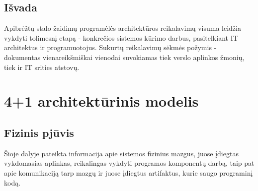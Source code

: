 \documentclass{VUMIFPSkursinis}
\begin{document}
\subsection{Išvada}
Apibrėžtų stalo žaidimų programėlės architektūros reikalavimų visuma leidžia vykdyti tolimesnį etapą - konkrečios sistemos kūrimo darbus, pasitelkiant IT architektus ir programuotojus. Sukurtų reikalavimų sėkmės požymis - dokumentas vienareikšmiškai vienodai suvokiamas tiek verslo aplinkos žmonių, tiek ir IT srities atstovų.


\section{4+1 architektūrinis modelis}

\subsection{Fizinis pjūvis}
Šioje dalyje pateikta informacija apie sistemos fizinius mazgus, juose įdiegtas vykdomasias aplinkas, reikalingas vykdyti programos komponentų darbą, taip pat apie komunikaciją tarp mazgų ir juose įdiegtus artifaktus, kurie saugo programinį kodą.
\end{document}
